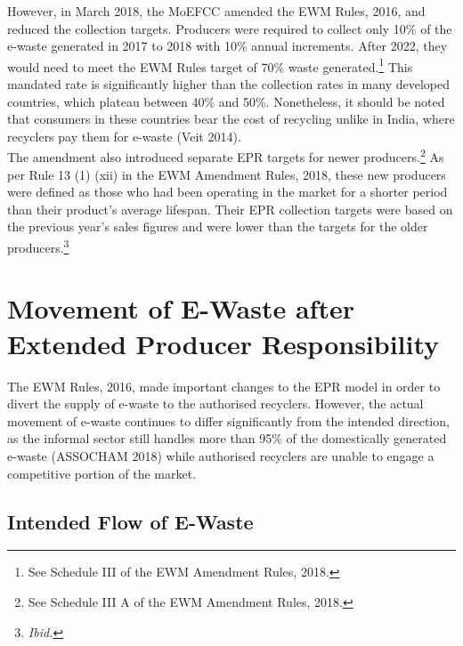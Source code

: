 \documentclass[a4paper, 12pt]{article}
\begin{document}
                    However, in March 2018, the MoEFCC amended the EWM Rules, 2016, and reduced the collection targets. Producers were required to collect only 10\% of the e-waste generated in 2017 to 2018 with 10\% annual increments. After 2022, they would need to meet the EWM Rules target of 70\% waste generated.\footnote{See Schedule III of the EWM Amendment Rules, 2018.} This mandated rate is significantly higher than the collection rates in many developed countries, which plateau between 40\% and 50\%. Nonetheless, it should be noted that consumers in these countries bear the cost of recycling unlike in India, where recyclers pay them for e-waste (Veit 2014). \\
                    
                    The amendment also introduced separate EPR targets for newer producers.\footnote{ See Schedule III A of the EWM Amendment Rules, 2018.} As per Rule 13 (1) (xii) in the EWM Amendment Rules, 2018, these new producers were defined as those who had been operating in the market for a shorter period than their product’s average lifespan. Their EPR collection targets were based on the previous year’s sales figures and were lower than the targets for the older producers.\footnote{\textit{Ibid.}} \\                     
                    
                    
                    \section{Movement of E-Waste after Extended Producer Responsibility}
                    
                    The EWM Rules, 2016, made important changes to the EPR model in order to divert the supply of e-waste to the authorised recyclers. However, the actual movement of e-waste continues to differ significantly from the intended direction, as the informal sector still handles more than 95\% of the domestically generated e-waste (ASSOCHAM 2018) while authorised recyclers are unable to engage a competitive portion of the market.\\ 
                                  
                    \subsection{Intended Flow of E-Waste}
                    
\end{document}

